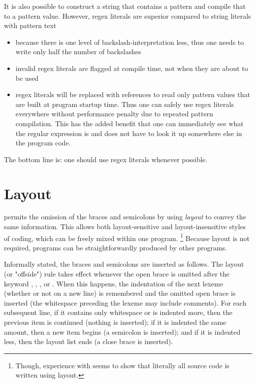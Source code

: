 It is also possible to construct a string that contains a pattern and compile that to a pattern value. However, regex literals are superior compared to string literals with pattern text
\begin{itemize}
\item because there is one level of backslash-interpretation less, thus one needs to write only half the number of backslashes
\item invalid regex literals are flagged at compile time, not when they are about to be used
\item regex literals will be replaced with references to read only pattern values that are built at program startup time. Thus one can safely use regex literals everywhere without performance penalty due to repeated pattern compilation. This has the added benefit that one can immediately see what the regular expression is and does not have to look it up somewhere else in the program code.
\end{itemize}
The bottom line is: one should use regex literals whenever possible.

\section{Layout} \label{layout}

\frege{} permits the omission of the braces and semicolons by using \emph{layout} to convey the same information.
This allows both layout-sensitive and layout-insensitive styles of coding, which can be freely mixed within one program.
\footnote{Though, experience with \haskell{} seems to show that literally all source code is written using layout.}
Because layout is not required, \frege{} programs can be straightforwardly produced by other programs.

Informally stated, the braces and semicolons are inserted as follows.
The layout (or "offside") rule takes effect whenever the open brace is omitted after the keyword , , , or .
When this happens, the indentation of the next lexeme (whether or not on a new line) is remembered and the omitted open brace is inserted (the whitespace preceding the lexeme may include comments).
For each subsequent line, if it contains only whitespace or is indented more, then the previous item is continued (nothing is inserted);
if it is indented the same amount, then a new item begins (a semicolon is inserted);
and if it is indented less, then the layout list ends (a close brace is inserted).

